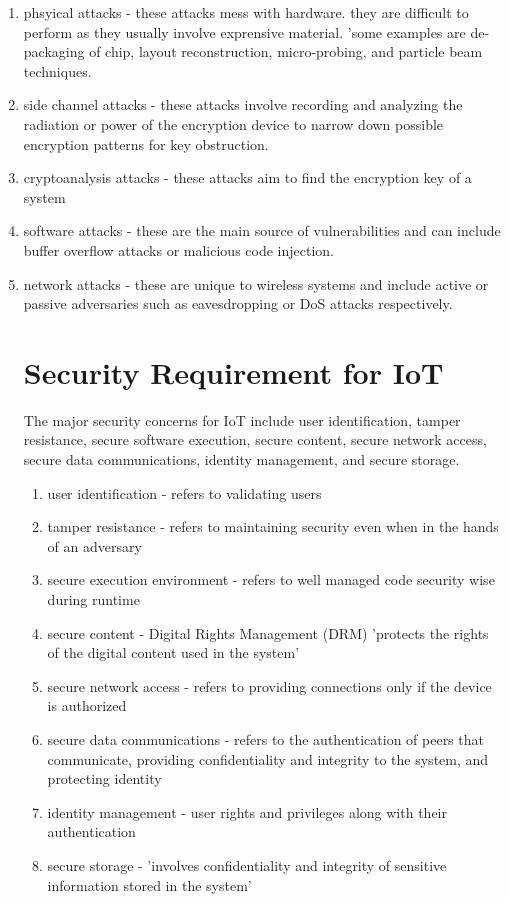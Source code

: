 \documentclass{article}
\begin{document}
\begin{enumerate}
\item phsyical attacks - these attacks mess with hardware. they are difficult to perform as they usually involve exprensive material. 'some examples are de-packaging of chip, layout reconstruction, micro-probing, and particle beam techniques.
\item side channel attacks - these attacks involve recording and analyzing the radiation or power of the encryption device to narrow down possible encryption patterns for key obstruction. 
\item cryptoanalysis attacks - these attacks aim to find the encryption key of a system
\item software attacks - these are the main source of vulnerabilities and can include buffer overflow attacks or malicious code injection.
\item network attacks - these are unique to wireless systems and include active or passive adversaries such as eavesdropping or DoS attacks respectively.

\section*{Security Requirement for IoT}
The major security concerns for IoT include user identification, tamper resistance, secure software execution, secure content, secure network access, secure data communications, identity management, and secure storage.

\begin{enumerate}
\item user identification - refers to validating users
\item tamper resistance - refers to maintaining security even when in the hands of an adversary
\item secure execution environment - refers to well managed code security wise during runtime
\item secure content - Digital Rights Management (DRM) 'protects the rights of the digital content used in the system'
\item secure network access - refers to providing connections only if the device is authorized
\item secure data communications - refers to the authentication of peers that communicate, providing confidentiality and integrity to the system, and protecting identity
\item identity management - user rights and privileges along with their authentication
\item secure storage - 'involves confidentiality and integrity of sensitive information stored in the system'
\end{enumerate}


\end{enumerate}
\end{document}

